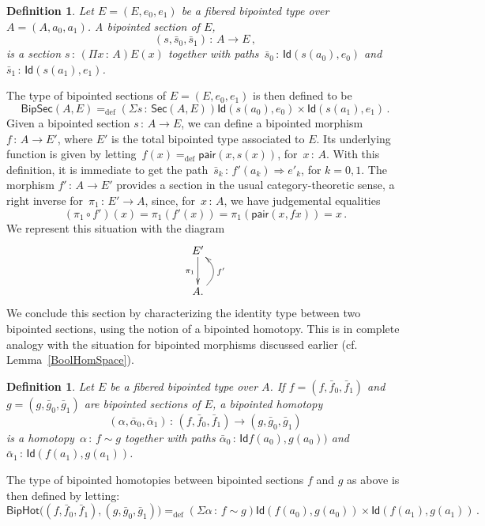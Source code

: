 \documentclass[10pt,a4paper,oneside,reqno]{amsart}
\theoremstyle{mythm}
\theoremstyle{mydef}
\newtheorem{definition}[theorem]{Definition}
\theoremstyle{myrmk}
\newcommand{\ie}{\text{i.e.\ }}
\newcommand{\deq}{=}
\newcommand{\defeq}{=_{\mathrm{def}}}
\newcommand{\co}{\,{:}\,}
\newcommand{\Id}{\mathsf{Id}}
\newcommand{\pair}{\mathsf{pair}}
\newcommand{\BipHot}{\mathsf{BipHot}}
\newcommand{\BipSec}{\mathsf{BipSec}}
\begin{document}
\begin{definition} \label{def:fibsection} Let $E = (E, e_0, e_1)$ be a fibered bipointed type over
$A = (A, a_0, a_1)$.  A \emph{bipointed section} of $E$, 
\[
(s, \bar{s}_0, \bar{s}_1) \co A \to E \, ,
\]
is a section $s \co (\Pi x \co A) E(x)$ together with paths~$\bar{s}_0 \co \Id(s(a_0), e_0)$ 
and $\bar{s}_1 \co  \Id( s(a_1) , e_1)$. 
\end{definition} 


The type of bipointed sections of $E = (E, e_0, e_1)$ is then defined to be
\[
\BipSec(A,E) \defeq (\Sigma s \co \mathsf{Sec}(A,E) )  \Id(s(a_0),  e_0)  \times \Id( s(a_1), e_1)  \, .
\]
Given a bipointed section $s \co A \to E$, we can define a bipointed morphism~$f  \co A \to E'$, where $E'$ is the
total bipointed type associated to $E$. Its underlying function is given by 
letting~$f(x) \defeq \pair(x, s(x))$, for~$x \co A$. With this definition, it is 
immediate to get the path~$\bar{s}_k \co f'(a_k) \Rightarrow e'_k$, for $k = 0, 1$.
The morphism $f' \co A \to E'$ provides a section in the usual category-theoretic sense, \ie a right inverse for~$\pi_1 \co E' \to A$,
 since, for~$x \co A$, we have judgemental equalities
\[
 (\pi_1 \circ f')(x) \deq \pi_1 (f'(x)) \deq \pi_1 (\pair(x, f x)) \deq x \, .
\]
 We represent this situation with the diagram
\[
\xymatrix{
E' \ar[d]_{\pi_1} \\
A . \ar@/_1.2pc/[u]_{f'} }
\]
We conclude this section by characterizing the identity type between two bipointed sections, using
the notion of a bipointed homotopy. This is in complete analogy with the situation for bipointed
morphisms discussed earlier (cf.\,Lemma~\ref{BoolHomSpace}). 


\begin{definition} \label{def:2cellsection} Let $E$ be a fibered bipointed type over $A$. If $f = (f, \bar{f}_0,\bar{f}_1)$ and $g = (g, \bar{g}_0, \bar{g}_1)$ are bipointed sections of $E$, a \emph{bipointed homotopy} 
\[
(\alpha, \bar{\alpha}_0, \bar{\alpha}_1) \co (f, \bar{f}_0, \bar{f}_1)  \rightarrow (g, \bar{g}_0, \bar{g}_1)
\]
is a homotopy~$\alpha \co f \sim g$ together with paths $\bar{\alpha}_0 \co \Id  f(a_0) ,  g(a_0))$ and 
$\bar{\alpha}_1 \co \Id( f(a_1),  g(a_1))$. 
\end{definition} 

The type of bipointed homotopies between bipointed sections $f$ and $g$ as above is then defined by letting:
\[
\BipHot \big( (f, \bar{f}_0, \bar{f}_1), (g, \bar{g}_0, \bar{g}_1) \big) \defeq
(\Sigma \alpha \co f \sim g) \Id ( f(a_0), g(a_0) ) \times \Id ( f(a_1) , g(a_1) ) \, .
\]
\end{document}
